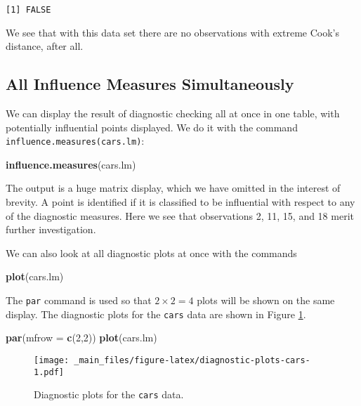 \documentclass[]{book}
\newenvironment{Shaded}{\begin{snugshade}}{\end{snugshade}}
\newcommand{\KeywordTok}[1]{\textcolor[rgb]{0.13,0.29,0.53}{\textbf{{#1}}}}
\newcommand{\DataTypeTok}[1]{\textcolor[rgb]{0.13,0.29,0.53}{{#1}}}
\newcommand{\DecValTok}[1]{\textcolor[rgb]{0.00,0.00,0.81}{{#1}}}
\newcommand{\NormalTok}[1]{{#1}}
\numberwithin{equation}{chapter}
\numberwithin{figure}{chapter}
\theoremstyle{plain}
\theoremstyle{definition}
\theoremstyle{remark}
\theoremstyle{definition}
\theoremstyle{definition}
\theoremstyle{remark}
\begin{document}
\begin{verbatim}
[1] FALSE
\end{verbatim}

We see that with this data set there are no observations with extreme
Cook's distance, after all.

\subsection{All Influence Measures
Simultaneously}\label{all-influence-measures-simultaneously}

We can display the result of diagnostic checking all at once in one
table, with potentially influential points displayed. We do it with the
command \texttt{influence.measures(cars.lm)}:

\begin{Shaded}
\begin{Highlighting}[]
\KeywordTok{influence.measures}\NormalTok{(cars.lm)}
\end{Highlighting}
\end{Shaded}

The output is a huge matrix display, which we have omitted in the
interest of brevity. A point is identified if it is classified to be
influential with respect to any of the diagnostic measures. Here we see
that observations 2, 11, 15, and 18 merit further investigation.

We can also look at all diagnostic plots at once with the commands

\begin{Shaded}
\begin{Highlighting}[]
\KeywordTok{plot}\NormalTok{(cars.lm)}
\end{Highlighting}
\end{Shaded}

The \texttt{par} command is used so that \(2\times 2 = 4\) plots will be
shown on the same display. The diagnostic plots for the \texttt{cars}
data are shown in Figure \ref{fig:diagnostic-plots-cars}.

\begin{Shaded}
\begin{Highlighting}[]
\KeywordTok{par}\NormalTok{(}\DataTypeTok{mfrow =} \KeywordTok{c}\NormalTok{(}\DecValTok{2}\NormalTok{,}\DecValTok{2}\NormalTok{))}
\KeywordTok{plot}\NormalTok{(cars.lm)}
\end{Highlighting}
\end{Shaded}

\begin{figure}[htbp]
\centering
\texttt{[image: \_main\_files/figure-latex/diagnostic-plots-cars-1.pdf]}
\caption{\label{fig:diagnostic-plots-cars}\small Diagnostic plots for the
\texttt{cars} data.}
\end{figure}
\end{document}
